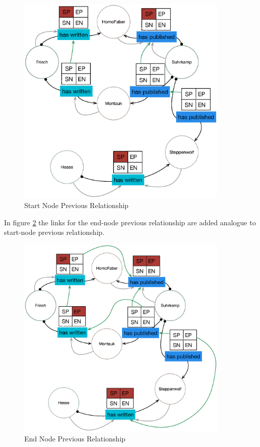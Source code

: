 \begin{figure}
	\centering
 	 	\includegraphics[width=0.9\textwidth]{images/StartNodePrevRel.eps}
	\caption{Start Node Previous Relationship}
	\label{fig5}
\end{figure}

In figure \ref{fig6} the links for the end-node previous relationship are added analogue to start-node previous relationship.

\begin{figure}
	\centering
 	 	\includegraphics[width=0.9\textwidth]{images/EndNodePrevRel.eps}
	\caption{End Node Previous Relationship}
	\label{fig6}
\end{figure}


